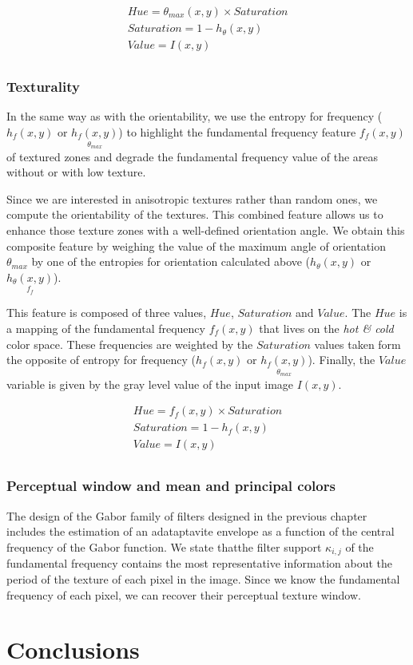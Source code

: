 \begin{gather}
    Hue = \theta_{max}(x,y) \times Saturation \\
    Saturation = 1 - h_{\theta} (x,y) \\
    Value = I(x,y) \\
\end{gather}

\subsubsection{Texturality}
In the same way as with the orientability, we use the entropy for frequency ($h_{f}(x,y)$ or $\underset{\theta_{max}}{h_{f}(x,y)}$) to highlight the fundamental frequency feature $f_f(x,y)$ of textured zones and degrade the fundamental frequency value of the areas without or with low texture.

Since we are interested in anisotropic textures rather than random ones, we compute the orientability of the textures. This combined feature allows us to enhance those texture zones with a well-defined orientation angle.
We obtain this composite feature by weighing the value of the maximum angle of orientation $\theta_{max}$ by one of the entropies for orientation calculated above ($h_{\theta}(x,y)$ or $\underset{f_{f}}{h_{\theta}(x,y)}$).

This feature is composed of three values, $Hue$, $Saturation$ and $Value$. The $Hue$ is a mapping of the fundamental frequency $f_f(x,y)$ that lives on the \textit{hot \& cold} color space. These frequencies are weighted by the $Saturation$ values taken form the opposite of entropy for frequency ($h_{f}(x,y)$ or $\underset{\theta_{max}}{h_{f}(x,y)}$). Finally, the $Value$ variable is given by the gray level value of the input image $I(x,y)$.

\begin{gather}
    Hue = f_f(x,y) \times Saturation \\
    Saturation = 1 - h_{f} (x,y) \\
    Value = I(x,y) \\
\end{gather}

\subsubsection{Perceptual window and mean and principal colors}
The design of the Gabor family of filters designed in the previous chapter includes the estimation of an adataptavite envelope as a function of the central frequency of the Gabor function. We state thatthe filter support  $\kappa_{i,j}$ of the fundamental frequency contains the most representative information about the period of the texture of each pixel in the image. Since we know the fundamental frequency of each pixel, we can recover their perceptual texture window. 


\section{Conclusions}
